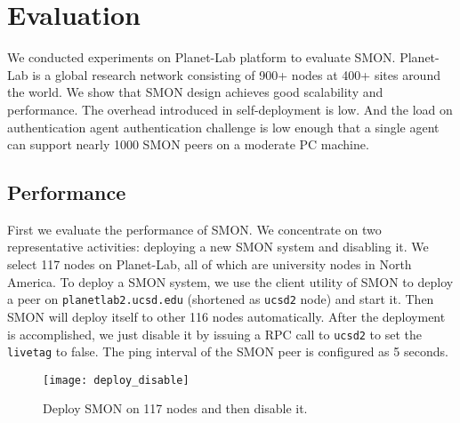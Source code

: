 \section{Evaluation}
\label{sec:eval}

We conducted experiments on Planet-Lab platform to evaluate
SMON. Planet-Lab is a global research network consisting of
900+ nodes at 400+ sites around the world.
We show that SMON design achieves good scalability and
performance. The overhead introduced in self-deployment is
low. And the load on authentication agent authentication
challenge is low enough that a single agent can support
nearly 1000 SMON peers on a moderate PC machine.

%

\subsection{Performance}

First we evaluate the performance of SMON. We concentrate on
two representative activities: deploying a new SMON system
and disabling it. We select 117 nodes on Planet-Lab, all of
which are university nodes in North America. To deploy a
SMON system, we use the client utility of SMON to deploy a
peer on \texttt{planet\-lab2.ucsd.edu} (shortened as
\texttt{ucsd2} node) and start it. Then SMON will deploy
itself to other 116 nodes automatically. After the
deployment is accomplished, we just disable it by issuing a
RPC call to \texttt{ucsd2} to set the \texttt{livetag} to
false.  The ping interval of the SMON peer is configured as
5 seconds.
\begin{figure}[hbt]
\centering
\texttt{[image: deploy\_disable]}
\caption{Deploy SMON on 117 nodes and then disable it.}
\label{fig:smonperf}
\end{figure}

